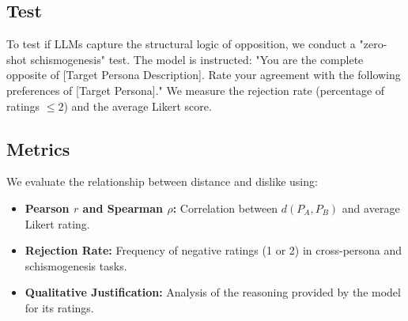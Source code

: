 \subsection{\Schismogenesis Test}

To test if LLMs capture the structural logic of opposition, we conduct a "zero-shot schismogenesis" test. The model is instructed: "You are the complete opposite of [Target Persona Description]. Rate your agreement with the following preferences of [Target Persona]." We measure the rejection rate (percentage of ratings $\le 2$) and the average Likert score.

\subsection{Metrics}

We evaluate the relationship between distance and dislike using:
\begin{itemize}[leftmargin=*,itemsep=0pt,topsep=0pt]
    \item {\bf Pearson $r$ and Spearman $\rho$:} Correlation between $d(P_A, P_B)$ and average Likert rating.
    \item {\bf Rejection Rate:} Frequency of negative ratings (1 or 2) in cross-persona and schismogenesis tasks.
    \item {\bf Qualitative Justification:} Analysis of the reasoning provided by the model for its ratings.
\end{itemize}
